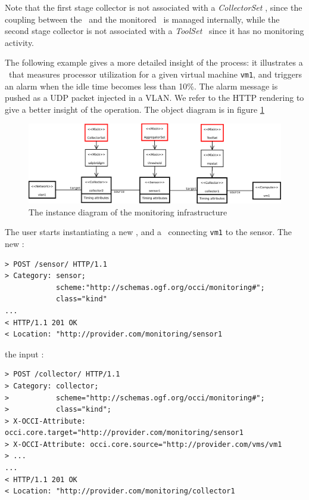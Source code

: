 \documentclass[12pt]{article}  %
\begin{document}
Note that the first stage collector is not associated with a {\em CollectorSet} \mi, since the coupling between the \sens\ and the monitored \rs\ is managed internally, while the second stage collector is not associated with a {\em ToolSet} \mi\ since it has no monitoring activity. 

The following example gives a more detailed insight of the process: it illustrates a \sens\ that measures processor utilization for a given virtual machine {\tt vm1}, and triggers an alarm when the idle time becomes less than 10\%. The alarm message is pushed as a UDP packet injected in a VLAN. We refer to the HTTP rendering to give a better insight of the operation. The object diagram is in figure \ref  {fig:example}

\begin{figure}
\centering
\includegraphics[width=\linewidth]{newDiagram_V3.pdf}
\caption{The instance diagram of the monitoring infrastructure \label{fig:example}}
\end{figure}

The user starts instantiating a new \sens, and a \coll\ connecting {\tt vm1} to the sensor. The new \sens:

\begin{verbatim}
> POST /sensor/ HTTP/1.1
> Category: sensor; 
            scheme:"http://schemas.ogf.org/occi/monitoring#"; 
            class="kind"
...
< HTTP/1.1 201 OK
< Location: "http://provider.com/monitoring/sensor1
\end{verbatim}

the input \coll:

\begin{verbatim}
> POST /collector/ HTTP/1.1
> Category: collector;
>           scheme="http://schemas.ogf.org/occi/monitoring#";
>           class="kind";
> X-OCCI-Attribute: occi.core.target="http://provider.com/monitoring/sensor1
> X-OCCI-Attribute: occi.core.source="http://provider.com/vms/vm1
> ...
...
< HTTP/1.1 201 OK
< Location: "http://provider.com/monitoring/collector1
\end{verbatim}
\end{document}
